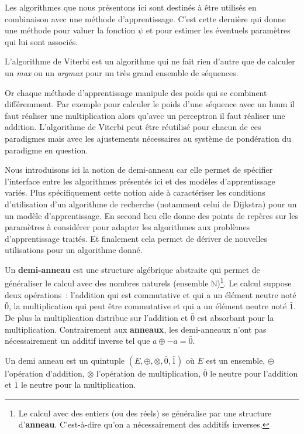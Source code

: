 \documentclass[11pt,openany]{book}
\newcommand{\ac}[1]{{\sc #1}} %
\newcommand{\kw}[1]{{\bf #1}} %
\begin{document}
Les algorithmes que nous présentons ici sont destinés à être utilisés
en combinaison avec une méthode d'apprentissage.
C'est cette dernière
qui donne une méthode pour valuer la fonction $\psi$ et pour estimer
les éventuels paramètres qui lui sont associés.

L'algorithme de Viterbi est un algorithme qui ne fait rien
d'autre que de calculer un {\sl max} ou un {\sl argmax} pour un
très grand ensemble de séquences.

Or chaque méthode d'apprentissage manipule des poids qui se combinent
différemment. Par exemple pour calculer le poids d'une séquence avec
un \ac{hmm} il faut réaliser une multiplication alors qu'avec un
perceptron il faut réaliser une addition. L'algorithme de Viterbi peut
être réutilisé pour chacun de ces paradigmes mais avec les ajustements
nécessaires au système de pondération du paradigme en question.

Nous introduisons ici la notion de demi-anneau
car elle permet de spécifier l'interface entre les
algorithmes présentés ici et des
modèles d'apprentissage variés. 
Plus spécifiquement cette notion aide à caractériser
les conditions d'utilisation d'un algorithme de recherche (notamment
celui de Dijkstra) pour un
un modèle d'apprentissage. En second lieu elle donne des points de
repères sur les paramètres à considérer pour adapter les algorithmes
aux problèmes d'apprentissage traités. Et finalement cela permet de
dériver de nouvelles utilisations pour un algorithme donné.

Un \kw{demi-anneau} est une structure algébrique abstraite qui
permet de généraliser le calcul avec des nombres naturels (ensemble
$\mathbb{N}$)\footnote{Le calcul avec des entiers (ou des réels) se
  généralise par une structure d'\kw{anneau}. C'est-à-dire qu'on a
  nécessairement des
additifs inverses.}.
Le calcul suppose deux opérations~: l'addition qui est commutative et
qui a un élément neutre noté $\bar{0}$, la multiplication qui peut
être commutative et qui a un élément neutre noté
$\bar{1}$. De plus la multiplication distribue sur l'addition et
$\bar{0}$ est absorbant pour la multiplication.
Contrairement aux \kw{anneaux}, les demi-anneaux n'ont pas
nécessairement un additif inverse tel que $a \oplus -a = \bar{0}$.

Un demi anneau est un quintuple $(E,\oplus,\otimes,\bar{0},\bar{1})$
où $E$ est un ensemble, 
$\oplus$ l'opération d'addition, $\otimes$ l'opération de multiplication, $\bar{0}$ le neutre pour l'addition et
$\bar{1}$ le neutre pour la multiplication.  
\end{document}
